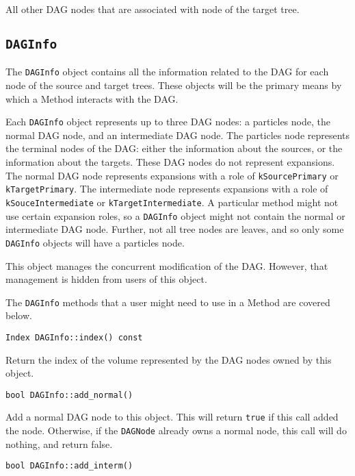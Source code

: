 \noindent All other DAG nodes that are associated with node of the target tree.



\subsection{\texttt{DAGInfo}}

The \texttt{DAGInfo} object contains all the information related to the DAG
for each node of the source and target trees. These objects will be the
primary means by which a Method interacts with the DAG.

Each \texttt{DAGInfo} object represents up to three DAG nodes: a particles
node, the normal DAG node, and an intermediate DAG node. The particles node
represents the terminal nodes of the DAG: either the information about
the sources, or the information about the targets. These DAG nodes do not
represent expansions. The normal
DAG node represents expansions with a role of \texttt{kSourcePrimary} or
\texttt{kTargetPrimary}. The intermediate node represents expansions with a
role of \texttt{kSouceIntermediate} or \texttt{kTargetIntermediate}. A
particular method might not use certain expansion roles, so a
\texttt{DAGInfo} object might not contain the normal or intermediate DAG node.
Further, not all tree nodes are leaves, and so only some \texttt{DAGInfo}
objects will have a particles node.

This object manages the concurrent modification of the DAG. However, that
management is hidden from users of this object.

The \texttt{DAGInfo} methods that a user might need to use in a Method are
covered below.

\begin{lstlisting}
Index DAGInfo::index() const
\end{lstlisting}

\noindent Return the index of the volume represented by the DAG nodes owned by
this object.

\begin{lstlisting}
bool DAGInfo::add_normal()
\end{lstlisting}

\noindent Add a normal DAG node to this object. This will return \texttt{true}
if this call added the node. Otherwise, if the \texttt{DAGNode} already owns a
normal node, this call will do nothing, and return false.

\begin{lstlisting}
bool DAGInfo::add_interm()
\end{lstlisting}

